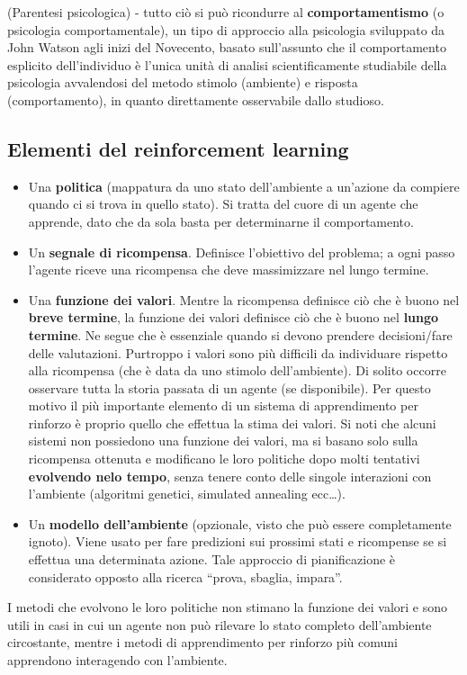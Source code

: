 (Parentesi psicologica) - tutto ciò si può ricondurre al \textbf{comportamentismo}
(o psicologia comportamentale), un tipo di approccio alla psicologia sviluppato da
John Watson agli inizi del Novecento, basato sull'assunto che il comportamento
esplicito dell'individuo è l'unica unità di analisi scientificamente studiabile della
psicologia avvalendosi del metodo stimolo (ambiente) e risposta (comportamento), in
quanto direttamente osservabile dallo studioso.

\subsection{Elementi del reinforcement learning}

\begin{itemize}
 \item Una \textbf{politica} (mappatura da uno stato dell'ambiente a un'azione da compiere
quando ci si trova in quello stato). Si tratta del cuore di un agente che apprende,
dato che da sola basta per determinarne il comportamento.
 \item Un \textbf{segnale di ricompensa}. Definisce l'obiettivo del problema; a ogni passo
l'agente riceve una ricompensa che deve massimizzare nel lungo termine.
 \item Una \textbf{funzione dei valori}. Mentre la ricompensa definisce ciò che è buono
nel \textbf{breve termine}, la funzione dei valori definisce ciò che è buono nel
\textbf{lungo termine}.
Ne segue che è essenziale quando si devono prendere decisioni/fare delle valutazioni.
Purtroppo i valori sono più difficili da individuare rispetto alla
ricompensa (che è data da uno stimolo dell'ambiente). Di solito occorre osservare tutta
la storia passata di un agente (se disponibile).
Per questo motivo il più importante elemento di un sistema di apprendimento per rinforzo
è proprio quello che effettua la stima dei valori.
Si noti che alcuni sistemi non possiedono una funzione dei valori, ma si basano solo
sulla ricompensa ottenuta e modificano le loro politiche dopo molti tentativi
\textbf{evolvendo nelo tempo}, senza tenere conto delle singole interazioni con l'ambiente
(algoritmi genetici, simulated annealing ecc\dots).
 \item Un \textbf{modello dell'ambiente} (opzionale, visto che può essere completamente
ignoto). Viene usato per fare predizioni sui prossimi stati e ricompense se si effettua una
determinata azione. Tale approccio di pianificazione è considerato opposto alla ricerca
``prova, sbaglia, impara''.
\end{itemize}

I metodi che evolvono le loro politiche non stimano la funzione dei valori e sono utili
in casi in cui un agente non può rilevare lo stato completo dell'ambiente circostante,
mentre i metodi di apprendimento per rinforzo più comuni apprendono interagendo con l'ambiente.
